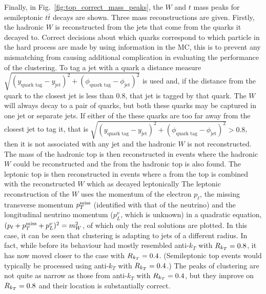 Finally, in Fig.~\ref{fig:top_correct_mass_peaks}, the $W$ and $t$ mass peaks for semileptonic $t\bar t$ decays are shown.
Three mass reconstructions are given.
Firstly, the hadronic \(W\) is reconstructed from the jets that come from the quarks it decayed to.
Correct decisions about which quarks correspond to which particle in the hard process are made by using information in the MC,
this is to prevent any mismatching from causing additional complication in evaluating the performance of the clustering.
To tag a jet with a quark a distance measure \(\sqrt{(y_\text{quark tag} - y_\text{jet})^2 + (\phi_\text{quark tag} - \phi_\text{jet})^2}\)
is used and, if the distance from the quark to the closest jet is less than \(0.8\), that jet is tagged by that quark.
The \(W\) will always decay to a pair of quarks, but both these quarks may be captured in one jet or separate jets.
If either of the these quarks are too far away from the closest jet to tag it,
that is \(\sqrt{(y_\text{quark tag} - y_\text{jet})^2 + (\phi_\text{quark tag} - \phi_\text{jet})^2} > 0.8\),
then it is not associated with any jet and the hadronic \(W\) is not reconstructed.
The mass of the hadronic top is then reconstructed in events where the hadronic \(W\) could be reconstructed and the 
from the hadronic top is also found.
The leptonic top is then reconstructed in events where a  from the top is combined with the reconstructed $W$ which as decayed leptonically
The leptonic reconstruction of the $W$ uses the momentum of the electron $p_\ell$, the missing transverse momentum $p_T^{\rm miss}$ (identified with that of the neutrino)
and the longitudinal neutrino momentum ($p_L^\nu$, which is unknown) in a quadratic equation, $(p_\ell+p_T^{\rm miss}+p_L^\nu)^2=m_W^2$, of which only the real solutions are plotted.  In this case, it can be seen that \spectral{} clustering is adapting to jets of a different radius. In fact, 
while before its behaviour had mostly resembled anti-$k_T$ with \(R_{k_T}{} = 0.8\), 
it has now moved closer to the case with \(R_{k_T}{} = 0.4\).
(Semileptonic top events would typically be processed using anti-$k_T$ with \(R_{k_T}{} = 0.4\).)
The peaks of \spectral{} clustering are not quite as narrow as those from anti-$k_T$ with \(R_{k_T}{} = 0.4\),
but they improve on \(R_{k_T}{} = 0.8\) and their  location is substantially correct.

